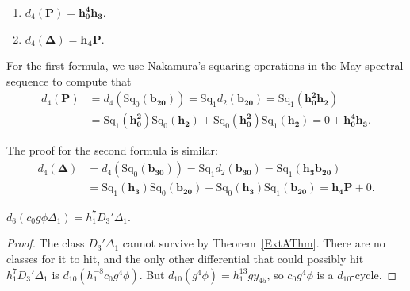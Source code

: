 \documentclass[10pt]{amsart}
\begin{document}
\begin{lemma}
\label{lem:d4}
\mbox{}
\begin{enumerate}
\item
$d_4({\mathbf{{P}}}) = {\mathbf{{h_0^4h_3}}}$.
\item
$d_4({\mathbf{{\Delta}}}) = {\mathbf{{h_4P}}}$.
\end{enumerate}
\end{lemma}

\begin{pf}
For the first formula,
we use Nakamura's squaring operations \cite{Nak} in the May spectral sequence
to compute that 
\[\begin{split}
 d_4({\mathbf{{P}}}) &= d_4 ({\ensuremath{\mathrm{Sq}}}_0({\mathbf{{b_{20}}}})) = {\ensuremath{\mathrm{Sq}}}_1 d_2({\mathbf{{b_{20}}}}) = {\ensuremath{\mathrm{Sq}}}_1({\mathbf{{h_0^2h_2}}}) \\ 
 &= {\ensuremath{\mathrm{Sq}}}_1({\mathbf{{h_0^2}}}){\ensuremath{\mathrm{Sq}}}_0({\mathbf{{h_2}}}) + {\ensuremath{\mathrm{Sq}}}_0({\mathbf{{h_0^2}}}){\ensuremath{\mathrm{Sq}}}_1({\mathbf{{h_2}}}) = 0 + {\mathbf{{h_0^4}}}{\mathbf{{h_3}}}.
 \end{split}\]

The proof for the second formula is similar:
\[\begin{split}
 d_4({\mathbf{{\Delta}}}) &= d_4 ({\ensuremath{\mathrm{Sq}}}_0({\mathbf{{b_{30}}}})) = {\ensuremath{\mathrm{Sq}}}_1 d_2({\mathbf{{b_{30}}}}) = {\ensuremath{\mathrm{Sq}}}_1({\mathbf{{h_3b_{20}}}}) \\ 
 &= {\ensuremath{\mathrm{Sq}}}_1({\mathbf{{h_3}}}){\ensuremath{\mathrm{Sq}}}_0({\mathbf{{b_{20}}}}) + {\ensuremath{\mathrm{Sq}}}_0({\mathbf{{h_3}}}){\ensuremath{\mathrm{Sq}}}_1({\mathbf{{b_{20}}}}) =  {\mathbf{{h_4}}}{\mathbf{{P}}}+ 0.
 \end{split}\]
\end{pf}

\begin{lemma}
\label{lem:d6}
$d_6(c_0g\phi\Delta_1) = h_1^7 D_3' \Delta_1$. 
\end{lemma}

\begin{proof}
The class $D_3'\Delta_1$ cannot survive by Theorem~\ref{ExtAThm}. 
There are no classes for it to hit, and the only other differential that could possibly hit $h_1^7 D_3'\Delta_1$ is $d_{10}(h_1^{-8} c_0g^4\phi)$. But $d_{10}(g^4\phi) = h_1^{13}gy_{45}$, so $c_0g^4\phi$ is a $d_{10}$-cycle.
\end{proof}
\end{document}
